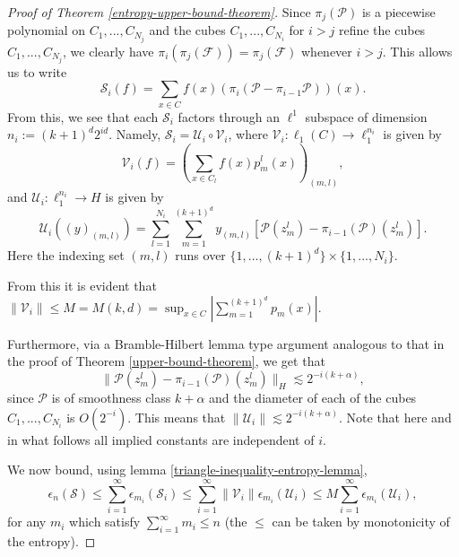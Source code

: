 \begin{proof}[Proof of Theorem \ref{entropy-upper-bound-theorem}]
Since $\pi_j(\mathcal{P})$ is a piecewise polynomial on $C_1,...,C_{N_j}$ and the cubes $C_1,...,C_{N_i}$ for $i > j$ refine the cubes $C_1,...,C_{N_j}$, we clearly have $\pi_i(\pi_j(\mathcal{F})) = \pi_j(\mathcal{F})$ whenever $i > j$. This allows us to write
 \begin{equation}
  \mathcal{S}_i(f) = \sum_{x\in C} f(x)(\pi_i(\mathcal{P} - \pi_{i-1}\mathcal{P}))(x).
 \end{equation}
From this, we see that each $\mathcal{S}_i$ factors through an $\ell^1$ subspace of dimension $n_i := (k+1)^d2^{id}$. Namely, $\mathcal{S}_i = \mathcal{U}_i\circ \mathcal{V}_i$, where $\mathcal{V}_i:\ell_1(C)\rightarrow \ell_1^{n_i}$ is given by
\begin{equation}
 \mathcal{V}_i(f) = \left(\sum_{x\in C_l}f(x)p_m^l(x)\right)_{(m,l)},
\end{equation}
and $\mathcal{U}_i: \ell_1^{n_i}\rightarrow H$ is given by
\begin{equation}
 \mathcal{U}_i((y)_{(m,l)}) = \sum_{l=1}^{N_i} \sum_{m=1}^{(k+1)^d} y_{(m,l)} \left[\mathcal{P}(z_m^l) - \pi_{i-1}(\mathcal{P})(z_{m}^l)\right].
\end{equation}
Here the indexing set $(m,l)$ runs over $\{1,...,(k+1)^d\}\times \{1,...,N_i\}$.

From this it is evident that $\|\mathcal{V}_i\| \leq M = M(k,d) = \sup_{x\in C}\left|\sum_{m=1}^{(k+1)^d} p_m(x)\right|$. 

Furthermore, via a Bramble-Hilbert lemma \cite{bramble1970estimation} type argument analogous to that in the proof of Theorem \ref{upper-bound-theorem}, we get that 
\begin{equation}
 \|\mathcal{P}(z_m^l) - \pi_{i-1}(\mathcal{P})(z_{m}^l)\|_H \lesssim 2^{-i(k+\alpha)},
\end{equation}
since $\mathcal{P}$ is of smoothness class $k+\alpha$ and the diameter of each of the cubes $C_1,...,C_{N_i}$ is $O(2^{-i})$. This means that $\|\mathcal{U}_i\| \lesssim 2^{-i(k+\alpha)}$. Note that here and in what follows all implied constants are independent of $i$.

We now bound, using lemma \ref{triangle-inequality-entropy-lemma},
\begin{equation}\label{eq-912}
 \epsilon_n(\mathcal{S}) \leq \sum_{i=1}^\infty \epsilon_{m_i}(\mathcal{S}_i)\leq \sum_{i=1}^\infty \|\mathcal{V}_i\|\epsilon_{m_i}(\mathcal{U}_i) \leq M\sum_{i=1}^\infty\epsilon_{m_i}(\mathcal{U}_i),
\end{equation}
for any $m_i$ which satisfy $\sum_{i=1}^\infty m_i \leq n$ (the $\leq$ can be taken by monotonicity of the entropy).


\end{proof}
